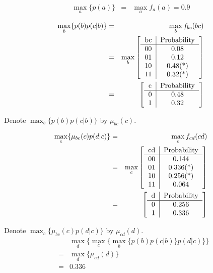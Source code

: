 \begin{eqnarray}
\max_{a} \{ p(a) \} &=& \max_{a}{f_a(a)} = 0.9 
\end{eqnarray}

\begin{eqnarray}
\max_{b} \{p(b)p(c|b) \} &=& 
\max_{b} f_{bc}(bc) \\
&=&\max_{b} \left[ 
\begin{tabular}{c|c}
bc & Probability \\
\hline
  00 &   0.08\\
  01 &   0.12\\
  10 &   0.48(*)\\
  11 &   0.32(*)\\
\end{tabular} \right] \\
&=& \left[ 
\begin{tabular}{c|c}
c & Probability \\
\hline
  0 &   0.48\\
  1 &   0.32\\
\end{tabular} \right]
\end{eqnarray}

Denote $\max_{b} \{p(b)p(c|b) \}$ by $\mu_{bc}(c)$. 

\begin{eqnarray}
	\max_{c} \{\mu_{bc}(c) p(d|c)\} &=& 
	\max_{c} f_{cd}(cd) \\
&=&\max_{c} \left[ 
\begin{tabular}{c|c}
cd & Probability \\
\hline
00 & 0.144 \\
01 & 0.336(*) \\
10 & 0.256(*) \\ 
11 & 0.064 \\
\end{tabular} \right] \\
&=&\left[ 
\begin{tabular}{c|c}
d & Probability \\
\hline
0 & 0.256 \\ 
1 & 0.336 
\end{tabular} \right]
\end{eqnarray}

Denote $\max_{c} \{\mu_{bc}(c) p(d|c)\}$ by $\mu_{cd}(d)$. 
\begin{eqnarray}
&& \max_{d} \{ \max_{c} \{\max_{b} \{p(b)p(c|b) \} p(d|c)\} \}  \\
&=& \max_{d}\{\mu_{cd}(d)\} \\
&=& 0.336 
\end{eqnarray}

